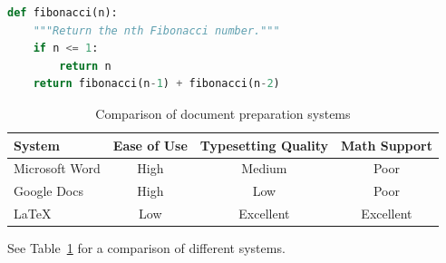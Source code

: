 \begin{lstlisting}[language=Python, caption={Fibonacci function}]
def fibonacci(n):
    """Return the nth Fibonacci number."""
    if n <= 1:
        return n
    return fibonacci(n-1) + fibonacci(n-2)
\end{lstlisting}

\begin{table}[H]
\centering
\caption{Comparison of document preparation systems}
\begin{tabular}{lccc}
\toprule
\textbf{System} & \textbf{Ease of Use} & \textbf{Typesetting Quality} & \textbf{Math Support} \\
\midrule
Microsoft Word & High & Medium & Poor \\
Google Docs & High & Low & Poor \\
\LaTeX & Low & Excellent & Excellent \\
\bottomrule
\end{tabular}
\label{tab:comparison}
\end{table}

See Table~\ref{tab:comparison} for a comparison of different systems.